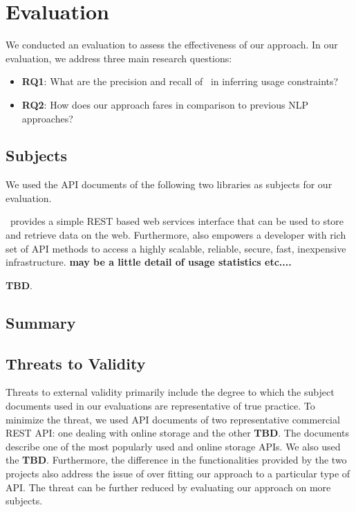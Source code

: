 \section{Evaluation}
\label{sec:evaluation}

We conducted an evaluation to assess the effectiveness of our approach. In our evaluation, we address three main research questions:

\begin{itemize}
	
\item\textbf{RQ1}: What are the precision and recall of \tool\ in inferring usage constraints?


\item\textbf{RQ2}: How does our approach fares in comparison to previous NLP approaches?

\end{itemize}

\subsection{Subjects}
\label{sub:subject}

We used the API documents of the following two libraries as subjects for our evaluation. 


\amazon\ provides a simple REST based web services interface that can be used to store and retrieve data on the web. Furthermore,  also empowers a developer with rich set of API methods to access a highly scalable, reliable, secure, fast, inexpensive infrastructure. \textbf{may be a little detail of usage statistics etc....}  

\textbf{TBD}.

\subsection{Summary}
\label{sub:summary}

\subsection{Threats to Validity}
\label{sub:threats_to_validity}
Threats to external validity primarily include the degree to which the subject documents used in our evaluations are representative of true practice. To minimize the threat, we used API documents of two representative commercial REST API: one dealing with online storage and the other \textbf{TBD}. The \amazon documents describe one of the most popularly used and online storage APIs. We also used the \textbf{TBD}. Furthermore, the difference in the functionalities provided by the two projects also address the issue of over fitting our approach to a particular type of API. The threat can be further reduced by evaluating our approach on more subjects. 

